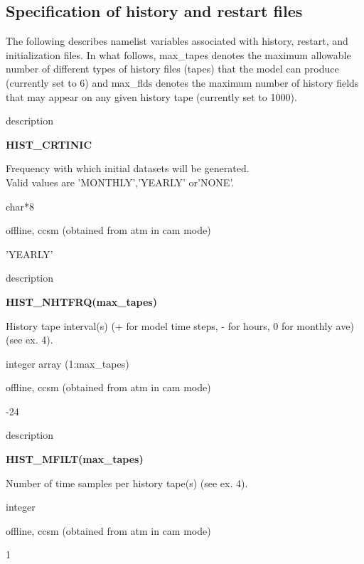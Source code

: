 \subsection {Specification of history and restart files}
\label{subsec_history_namelist}

The following describes namelist variables associated with history,
restart, and initialization files. In what follows, max\_tapes
denotes the maximum allowable number of different types of history
files (tapes) that the model can produce (currently set to 6) and
max\_flds denotes the maximum number of history fields that may appear
on any given history tape (currently set to 1000).

\bigskip
\begin{Ventry}{description}
 \item[{\bf name}] {\bf HIST\_CRTINIC}     
 \item[description] Frequency with which initial datasets will be 
	generated. \\ Valid values are 'MONTHLY','YEARLY' or'NONE'. 
 \item[type] char*8     
 \item[mode] offline, ccsm (obtained from atm in cam mode) 
 \item[default] 'YEARLY'                                                        
\end{Ventry}
\medskip

\begin{Ventry}{description}
 \item[{\bf name}] {\bf HIST\_NHTFRQ(max\_tapes)}     
 \item[description] History tape interval(s) 
	(+ for model time steps, - for hours, 0 for monthly ave) (see ex. 4). 
 \item[type] integer array (1:max\_tapes)   
 \item[mode] offline, ccsm (obtained from atm in cam mode) 
 \item[default] -24                                                             
\end{Ventry}
\medskip

\begin{Ventry}{description}
 \item[{\bf name}] {\bf HIST\_MFILT(max\_tapes)}      
 \item[description] Number of time samples per history tape(s) (see ex. 4). 
 \item[type] integer 
 \item[mode] offline, ccsm (obtained from atm in cam mode) 
 \item[default] 1                                                               
\end{Ventry}
\medskip

